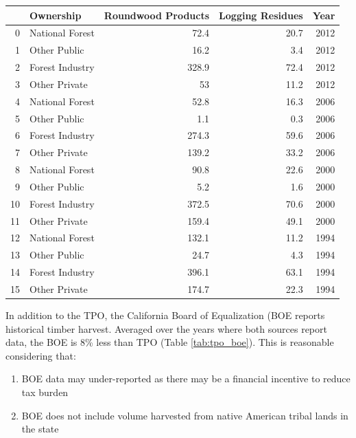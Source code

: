\documentclass[a4paper]{article}
\begin{document}
\begin{center}
\begin{tabular}{rlrrr}
 & Ownership & Roundwood Products & Logging Residues & Year\\
\hline
0 & National Forest & 72.4 & 20.7 & 2012\\
1 & Other Public & 16.2 & 3.4 & 2012\\
2 & Forest Industry & 328.9 & 72.4 & 2012\\
3 & Other Private & 53 & 11.2 & 2012\\
4 & National Forest & 52.8 & 16.3 & 2006\\
5 & Other Public & 1.1 & 0.3 & 2006\\
6 & Forest Industry & 274.3 & 59.6 & 2006\\
7 & Other Private & 139.2 & 33.2 & 2006\\
8 & National Forest & 90.8 & 22.6 & 2000\\
9 & Other Public & 5.2 & 1.6 & 2000\\
10 & Forest Industry & 372.5 & 70.6 & 2000\\
11 & Other Private & 159.4 & 49.1 & 2000\\
12 & National Forest & 132.1 & 11.2 & 1994\\
13 & Other Public & 24.7 & 4.3 & 1994\\
14 & Forest Industry & 396.1 & 63.1 & 1994\\
15 & Other Private & 174.7 & 22.3 & 1994\\
\end{tabular}

\end{center}


In addition to the TPO, the California Board of Equalization (BOE
reports historical timber harvest.  Averaged over the years where both
sources report data, the BOE is 8\% less than TPO (Table \ref{tab:tpo_boe}). This is reasonable considering that:
\begin{enumerate}
\item BOE data may under-reported as there may be a financial incentive to reduce tax burden
\item BOE does not include volume harvested from native American tribal lands in the state
\end{enumerate}
\end{document}
